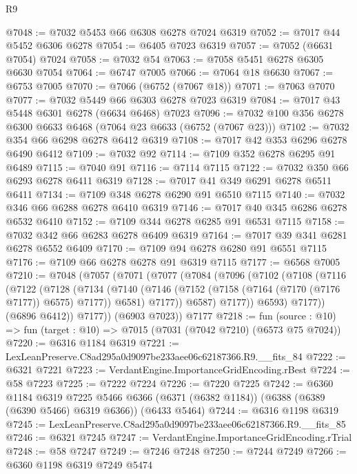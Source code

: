 \begin{lexlean}{R9}
\begin{coremodule}
@7048 := @7032 @5453 @66 @6308 @6278 @7024 @6319
@7052 := @7017 @44 @5452 @6306 @6278
@7054 := @6405 @7023 @6319
@7057 := @7052 (@6631 @7054) @7024
@7058 := @7032 @54
@7063 := @7058 @5451 @6278 @6305 @6630 @7054
@7064 := @6747 @7005
@7066 := @7064 @18 @6630
@7067 := @6753 @7005
@7070 := @7066 (@6752 (@7067 @18))
@7071 := @7063 @7070
@7077 := @7032 @5449 @66 @6303 @6278 @7023 @6319
@7084 := @7017 @43 @5448 @6301 @6278 (@6634 @6468) @7023
@7096 := @7032 @100 @356 @6278 @6300 @6633 @6468 (@7064 @23 @6633 (@6752 (@7067 @23)))
@7102 := @7032 @354 @66 @6298 @6278 @6412 @6319
@7108 := @7017 @42 @353 @6296 @6278 @6490 @6412
@7109 := @7032 @92
@7114 := @7109 @352 @6278 @6295 @91 @6489
@7115 := @7040 @91
@7116 := @7114 @7115
@7122 := @7032 @350 @66 @6293 @6278 @6411 @6319
@7128 := @7017 @41 @349 @6291 @6278 @6511 @6411
@7134 := @7109 @348 @6278 @6290 @91 @6510 @7115
@7140 := @7032 @346 @66 @6288 @6278 @6410 @6319
@7146 := @7017 @40 @345 @6286 @6278 @6532 @6410
@7152 := @7109 @344 @6278 @6285 @91 @6531 @7115
@7158 := @7032 @342 @66 @6283 @6278 @6409 @6319
@7164 := @7017 @39 @341 @6281 @6278 @6552 @6409
@7170 := @7109 @94 @6278 @6280 @91 @6551 @7115
@7176 := @7109 @66 @6278 @6278 @91 @6319 @7115
@7177 := @6568 @7005
@7210 := @7048
    (@7057
      (@7071
        (@7077
          (@7084
            (@7096
              (@7102
                (@7108
                  (@7116
                    (@7122
                      (@7128
                        (@7134
                          (@7140
                            (@7146 (@7152 (@7158 (@7164 (@7170 (@7176 @7177)) @6575) @7177)) @6581)
                            @7177))
                        @6587)
                      @7177))
                  @6593)
                @7177))
            (@6896 @6412))
          @7177))
      (@6903 @7023))
    @7177
@7218 := fun (source : @10) => fun (target : @10) => @7015 (@7031 (@7042 @7210) (@6573 @75 @7024))
@7220 := @6316 @1184 @6319
@7221 := LexLeanPreserve.C8ad295a0d9097be233aee06c62187366.R9.__fits_84
@7222 := @6321 @7221
@7223 := VerdantEngine.ImportanceGridEncoding.rBest
@7224 := @58 @7223
@7225 := @7222 @7224
@7226 := @7220 @7225
@7242 := @6360
    @1184
    @6319
    @7225
    @5466
    @6366
    (@6371 (@6382 @1184))
    (@6388 (@6389 (@6390 @5466) @6319 @6366))
    (@6433 @5464)
@7244 := @6316 @1198 @6319
@7245 := LexLeanPreserve.C8ad295a0d9097be233aee06c62187366.R9.__fits_85
@7246 := @6321 @7245
@7247 := VerdantEngine.ImportanceGridEncoding.rTrial
@7248 := @58 @7247
@7249 := @7246 @7248
@7250 := @7244 @7249
@7266 := @6360
    @1198
    @6319
    @7249
    @5474

\end{coremodule}
\end{lexlean}
